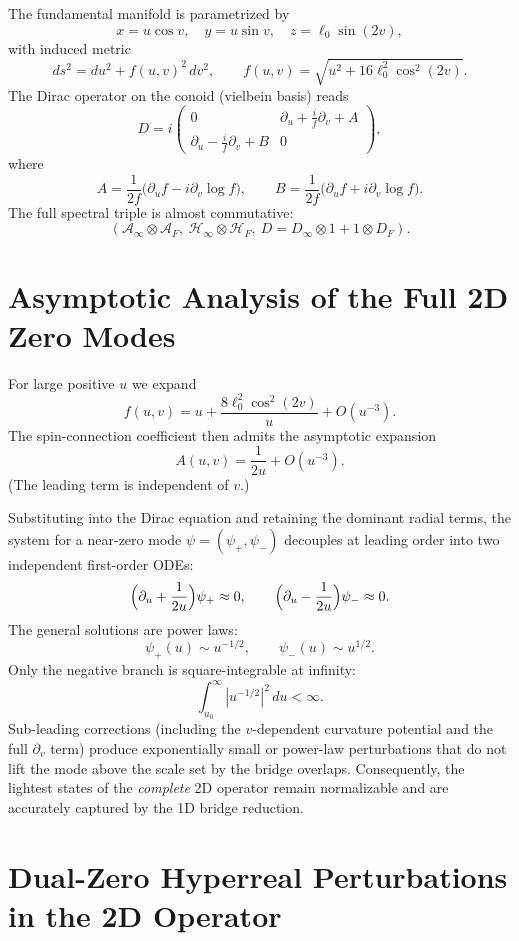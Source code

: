 \documentclass[11pt,a4paper]{article}
\begin{document}
The fundamental manifold is parametrized by
\[
x = u\cos v,\quad y = u\sin v,\quad z = \ell_0\sin(2v),
\]
with induced metric
\[
ds^2 = du^2 + f(u,v)^2\,dv^2,\qquad f(u,v)=\sqrt{u^2+16\ell_0^2\cos^2(2v)}.
\]
The Dirac operator on the conoid (vielbein basis) reads
\[
D = i\begin{pmatrix}
0 & \partial_u + \frac{i}{f}\partial_v + A \\
\partial_u - \frac{i}{f}\partial_v + B & 0
\end{pmatrix},
\]
where
\[
A = \frac{1}{2f}\bigl(\partial_u f - i\partial_v\log f\bigr),\qquad
B = \frac{1}{2f}\bigl(\partial_u f + i\partial_v\log f\bigr).
\]
The full spectral triple is almost commutative:
\[
(\mathcal{A}_\infty\otimes\mathcal{A}_F,\ \mathcal{H}_\infty\otimes\mathcal{H}_F,\ D = D_\infty\otimes 1 + 1\otimes D_F).
\]

\section{Asymptotic Analysis of the Full 2D Zero Modes}

For large positive \(u\) we expand
\[
f(u,v) = u + \frac{8\ell_0^2\cos^2(2v)}{u} + O(u^{-3}).
\]
The spin-connection coefficient then admits the asymptotic expansion
\[
A(u,v) = \frac{1}{2u} + O(u^{-3}).
\]
(The leading term is independent of \(v\).)

Substituting into the Dirac equation and retaining the dominant radial terms, the system for a near-zero mode \(\psi = (\psi_+,\psi_-)\) decouples at leading order into two independent first-order ODEs:
\[
\Bigl(\partial_u + \frac{1}{2u}\Bigr)\psi_+ \approx 0, \qquad
\Bigl(\partial_u - \frac{1}{2u}\Bigr)\psi_- \approx 0.
\]
The general solutions are power laws:
\[
\psi_+(u) \sim u^{-1/2},\qquad \psi_-(u) \sim u^{1/2}.
\]
Only the negative branch is square-integrable at infinity:
\[
\int_{u_0}^\infty |u^{-1/2}|^2\,du < \infty.
\]
Sub-leading corrections (including the \(v\)-dependent curvature potential and the full \(\partial_v\) term) produce exponentially small or power-law perturbations that do not lift the mode above the scale set by the bridge overlaps. Consequently, the lightest states of the \emph{complete} 2D operator remain normalizable and are accurately captured by the 1D bridge reduction.

\section{Dual-Zero Hyperreal Perturbations in the 2D Operator}
\end{document}
